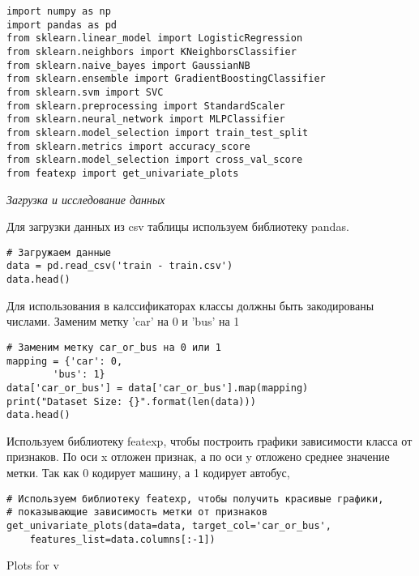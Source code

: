 \begin{verbatim}
import numpy as np
import pandas as pd
from sklearn.linear_model import LogisticRegression
from sklearn.neighbors import KNeighborsClassifier
from sklearn.naive_bayes import GaussianNB
from sklearn.ensemble import GradientBoostingClassifier
from sklearn.svm import SVC
from sklearn.preprocessing import StandardScaler
from sklearn.neural_network import MLPClassifier
from sklearn.model_selection import train_test_split
from sklearn.metrics import accuracy_score
from sklearn.model_selection import cross_val_score
from featexp import get_univariate_plots
\end{verbatim}

\textit{Загрузка и исследование данных}

Для загрузки данных из csv таблицы используем библиотеку pandas.

\begin{verbatim}
# Загружаем данные
data = pd.read_csv('train - train.csv')
data.head()
\end{verbatim}

Для использования в калссификаторах классы должны быть закодированы числами. Заменим метку 'car' на 0 и 'bus' на 1

\begin{verbatim}
# Заменим метку car_or_bus на 0 или 1
mapping = {'car': 0,
        'bus': 1}
data['car_or_bus'] = data['car_or_bus'].map(mapping)
print("Dataset Size: {}".format(len(data)))
data.head()
\end{verbatim}

Используем библиотеку featexp, чтобы построить графики зависимости класса от признаков. По оси x отложен признак, а по оси y отложено среднее значение метки. Так как 0 кодирует машину, а 1 кодирует автобус,

\begin{verbatim}
# Используем библиотеку featexp, чтобы получить красивые графики, 
# показывающие зависимость метки от признаков
get_univariate_plots(data=data, target_col='car_or_bus', 
    features_list=data.columns[:-1])
\end{verbatim}

\newpage

\begin{center}
    Plots for v
\end{center}



